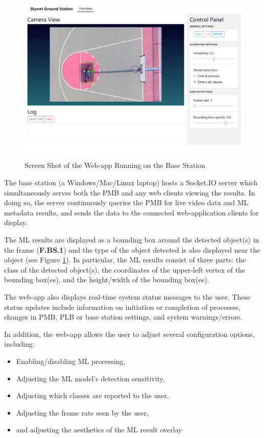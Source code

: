 \begin{figure}[H]
\begin{mdframed}
\centering
\includegraphics[width=15cm]{img/base_station.png}
\end{mdframed}
\caption{Screen Shot of the Web-app Running on the Base Station}
\label{basestationdiag}
\end{figure}

The base station (a Windows/Mac/Linux laptop) hosts a Socket.IO server which simultaneously serves both the PMB and any web clients viewing the results. In doing so, the server continuously queries the PMB for live video data and ML metadata results, and sends the data to the connected web-application clients for display.

The ML results are displayed as a bounding box around the detected object(s) in the frame (\textbf{F.BS.1}) and the type of the object detected is also displayed near the object (see Figure \ref{basestationdiag}). In particular, the ML results consist of three parts: the class of the detected object(s), the coordinates of the upper-left vertex of the bounding box(es), and the height/width of the bounding box(es).

The web-app also displays real-time system status messages to the user. These status updates include information on initiation or completion of processes, changes in PMB, PLB or base station settings, and system warnings/errors.

In addition, the web-app allows the user to adjust several configuration options, including:

\begin{itemize}
\item Enabling/disabling ML processing,
\item Adjusting the ML model's detection sensitivity,
\item Adjusting which classes are reported to the user,
\item Adjusting the frame rate seen by the user,
\item and adjusting the aesthetics of the ML result overlay
\end{itemize}

